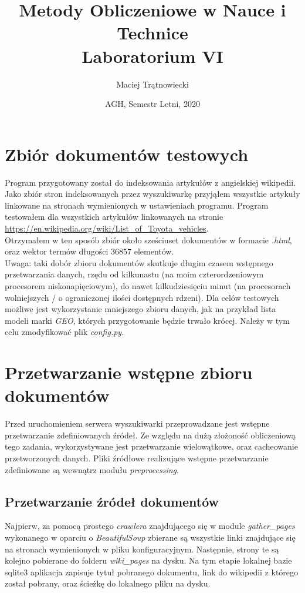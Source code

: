\documentclass{article}
\title{Metody Obliczeniowe w Nauce i Technice\\ 
Laboratorium VI}
\author{Maciej Trątnowiecki}
\date{AGH, Semestr Letni, 2020}
\begin{document}
    \maketitle
    \section{Zbiór dokumentów testowych}
        Program przygotowany został do indeksowania artykułów z angielskiej wikipedii. Jako zbiór stron indeksowanych przez wyszukiwarkę przyjąłem wszystkie artykuły linkowane na stronach wymienionych w ustawieniach programu. Program testowałem dla wszystkich artykułów linkowanych na stronie \url{https://en.wikipedia.org/wiki/List_of_Toyota_vehicles}.\\
        
        Otrzymałem w ten sposób zbiór około sześciuset dokumentów w formacie \textit{.html}, oraz wektor termów długości $36857$ elementów.\\
        Uwaga: taki dobór zbioru dokumentów skutkuje długim czasem wstępnego przetwarzania danych, rzędu od kilkunastu (na moim czterordzeniowym procesorem niskonapięciowym), do nawet kilkudziesięciu minut (na procesorach wolniejszych / o ograniczonej ilości dostępnych rdzeni). Dla celów testowych możliwe jest wykorzystanie mniejszego zbioru danych, jak na przykład lista modeli marki \textit{GEO}, których przygotowanie będzie trwało krócej. Należy w tym celu zmodyfikować plik \textit{config.py}.
        
    \section{Przetwarzanie wstępne zbioru dokumentów}
        Przed uruchomieniem serwera wyszukiwarki przeprowadzane jest wstępne przetwarzanie zdefiniowanych źródeł. Ze względu na dużą złożoność obliczeniową tego zadania, wykorzystywane jest przetwarzanie wielowątkowe, oraz cacheowanie przetworzonych danych. Pliki źródłowe realizujące wstępne przetwarzanie zdefiniowane są wewnątrz modułu \textit{preprocessing}.\\
        \subsection{Przetwarzanie źródeł dokumentów}
        Najpierw, za pomocą prostego \textit{crawlera} znajdującego się w module \textit{gather\_pages} wykonanego w oparciu o \textit{BeautifulSoup} zbierane są wszystkie linki znajdujące się na stronach wymienionych w pliku konfiguracyjnym. Następnie, strony te są kolejno pobierane do folderu \textit{wiki\_pages} na dysku. Na tym etapie lokalnej bazie sqlite3 aplikacja zapisuje tytuł pobranego dokumentu, link do wikipedii z którego został pobrany, oraz ścieżkę do lokalnego pliku na dysku. 
        
\end{document}
